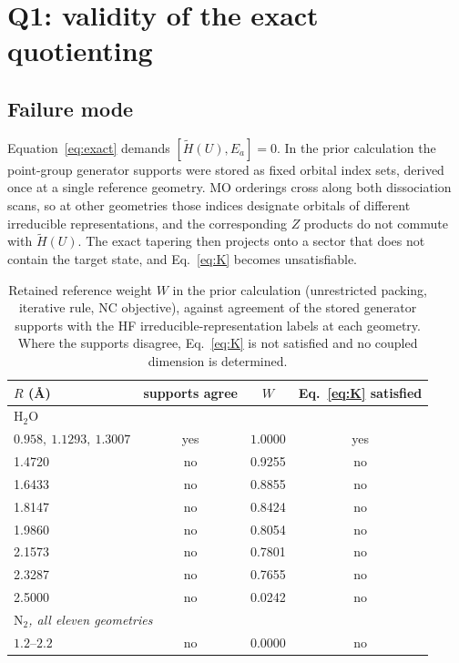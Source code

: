 \documentclass[11pt]{article}
\newcommand{\Ht}{\widetilde H}
\begin{document}
\section{Q1: validity of the exact quotienting}
\label{sec:q1}

\subsection{Failure mode}
Equation~\eqref{eq:exact} demands $[\Ht(U),E_a]=0$. In the prior calculation the
point-group generator supports were stored as fixed orbital index sets, derived
once at a single reference geometry. MO orderings cross along both dissociation
scans, so at other geometries those indices designate orbitals of different
irreducible representations, and the corresponding $Z$ products do not commute
with $\Ht(U)$. The exact tapering then projects onto a sector that does not
contain the target state, and Eq.~\eqref{eq:K} becomes unsatisfiable.

\begin{table}[htbp]
\centering
\caption{Retained reference weight $W$ in the prior calculation (unrestricted
packing, iterative rule, NC objective), against agreement of the stored
generator supports with the HF irreducible-representation labels at each
geometry. Where the supports disagree, Eq.~\eqref{eq:K} is not satisfied and no
coupled dimension is determined.}
\label{tab:q1}
\begin{tabular}{lccc}
\toprule
$R$ (\AA) & supports agree & $W$ & Eq.~\eqref{eq:K} satisfied \\
\midrule
\multicolumn{4}{l}{\emph{$\mathrm{H_2O}$}}\\
$0.958,\ 1.1293,\ 1.3007$ & yes & $1.0000$ & yes \\
1.4720 & no & 0.9255 & no \\
1.6433 & no & 0.8855 & no \\
1.8147 & no & 0.8424 & no \\
1.9860 & no & 0.8054 & no \\
2.1573 & no & 0.7801 & no \\
2.3287 & no & 0.7655 & no \\
2.5000 & no & 0.0242 & no \\
\midrule
\multicolumn{4}{l}{\emph{$\mathrm{N_2}$, all eleven geometries}}\\
$1.2$--$2.2$ & no & $\mathbf{0.0000}$ & no \\
\bottomrule
\end{tabular}
\end{table}
\end{document}

